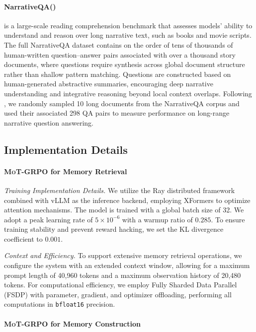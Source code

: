 \documentclass[11pt, a4paper]{lumia}
\newcommand{\ourtrain}{{\textsc{MoT-GRPO}}\xspace} %
\begin{document}
\paragraph{NarrativeQA(\citep{kočiský2017narrativeqareadingcomprehensionchallenge})} is a large-scale reading comprehension benchmark that assesses models’ ability to understand and reason over long narrative text, such as books and movie scripts. The full NarrativeQA dataset contains on the order of tens of thousands of human-written question–answer pairs associated with over a thousand story documents, where questions require synthesis across global document structure rather than shallow pattern matching. Questions are constructed based on human-generated abstractive summaries, encouraging deep narrative understanding and integrative reasoning beyond local context overlaps. Following \citep{hu2026memorymattersmoreeventcentric}, we randomly sampled 10 long documents from the NarrativeQA corpus and used their associated 298 QA pairs to measure performance on long-range narrative question answering. 

\subsection{Implementation Details}
\label{app:imple}
\paragraph{\ourtrain for Memory Retrieval}

\noindent\textit{Training Implementation Details.} 
We utilize the Ray distributed framework combined with vLLM as the inference backend, employing XFormers to optimize attention mechanisms. The model is trained with a global batch size of 32. We adopt a peak learning rate of $5 \times 10^{-6}$ with a warmup ratio of $0.285$. To ensure training stability and prevent reward hacking, we set the KL divergence coefficient to $0.001$. 

\noindent\textit{Context and Efficiency.} 
To support extensive memory retrieval operations, we configure the system with an extended context window, allowing for a maximum prompt length of 40,960 tokens and a maximum observation history of 20,480 tokens. For computational efficiency, we employ Fully Sharded Data Parallel (FSDP) with parameter, gradient, and optimizer offloading, performing all computations in \texttt{bfloat16} precision.

\paragraph{\ourtrain for Memory Construction}
\end{document}
